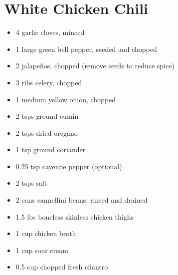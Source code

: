 \section{White Chicken Chili}

\begin{itemize}
\item 4 garlic cloves, minced
\item 1 large green bell pepper, seeded and chopped
\item 2 jalape\~{n}os, chopped (remove seeds to reduce spice)
\item 3 ribs celery, chopped
\item 1 medium yellow onion, chopped
\item 2 tsps ground cumin
\item 2 tsps dried oregano
\item 1 tsp ground coriander
\item 0.25 tsp cayenne pepper (optional)
\item 2 tsps salt
\item 2 cans cannellini beans, rinsed and drained
\item 1.5 lbs boneless skinless chicken thighs
\item 1 cup chicken broth
\item 1 cup sour cream
\item 0.5 cup chopped fresh cilantro
\end{itemize}

